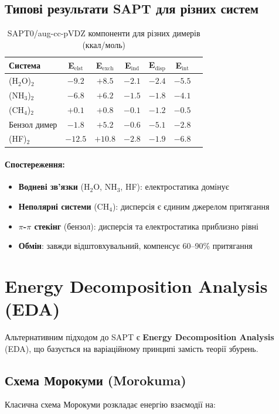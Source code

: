 \subsection{Типові результати SAPT для різних систем}

\begin{table}[h]
\centering
\small
\begin{tabular}{lcccccc}
\hline
\textbf{Система} & \textbf{E$_{\text{elst}}$} & \textbf{E$_{\text{exch}}$} & \textbf{E$_{\text{ind}}$} & \textbf{E$_{\text{disp}}$} & \textbf{E$_{\text{int}}$} \\
\hline
(H$_2$O)$_2$  & $-9.2$  & $+8.5$  & $-2.1$  & $-2.4$  & $-5.5$ \\
(NH$_3$)$_2$  & $-6.8$  & $+6.2$  & $-1.5$  & $-1.8$  & $-4.1$ \\
(CH$_4$)$_2$  & $+0.1$  & $+0.8$  & $-0.1$  & $-1.2$  & $-0.5$ \\
Бензол димер  & $-1.8$  & $+5.2$  & $-0.6$  & $-5.1$  & $-2.8$ \\
(HF)$_2$      & $-12.5$ & $+10.8$ & $-2.8$  & $-1.9$  & $-6.8$ \\
\hline
\end{tabular}
\caption{SAPT0/aug-cc-pVDZ компоненти для різних димерів (ккал/моль)}
\end{table}

\paragraph{Спостереження:}
\begin{itemize}
    \item \textbf{Водневі зв'язки} (H$_2$O, NH$_3$, HF): електростатика домінує
    \item \textbf{Неполярні системи} (CH$_4$): дисперсія є єдиним джерелом притягання
    \item \textbf{$\pi$-$\pi$ стекінг} (бензол): дисперсія та електростатика приблизно рівні
    \item \textbf{Обмін}: завжди відштовхувальний, компенсує 60--90\% притягання
\end{itemize}

\section{Energy Decomposition Analysis (EDA)}

Альтернативним підходом до SAPT є \textbf{Energy Decomposition Analysis} (EDA), що базується на варіаційному принципі замість теорії збурень.

\subsection{Схема Морокуми (Morokuma)}

Класична схема Морокуми розкладає енергію взаємодії на: